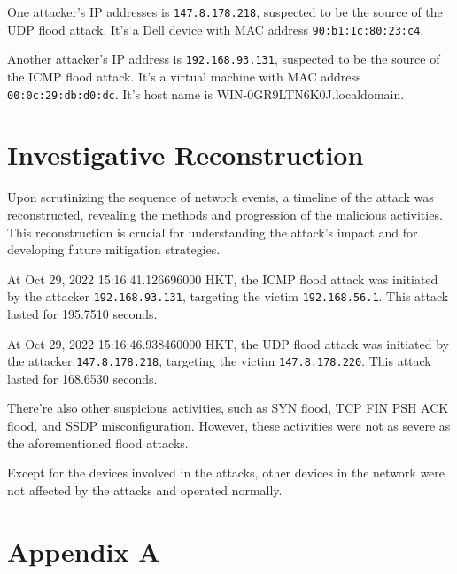 \documentclass{article}
\begin{document}
    One attacker's IP addresses is \lstinline|147.8.178.218|, suspected to be the source of the UDP flood attack.
    It's a Dell device with MAC address \lstinline|90:b1:1c:80:23:c4|.

    Another attacker's IP address is \lstinline|192.168.93.131|, suspected to be the source of the ICMP flood attack.
    It's a virtual machine with MAC address \lstinline|00:0c:29:db:d0:dc|.
    It's host name is WIN-0GR9LTN6K0J.localdomain.

    
    \section{\fontsize{14pt}{17pt}\selectfont Investigative Reconstruction}\label{sec:selectfont-investigative-reconstruction}
    Upon scrutinizing the sequence of network events, a timeline of the attack was reconstructed,
    revealing the methods and progression of the malicious activities.
    This reconstruction is crucial for understanding the attack's impact and for developing future mitigation strategies.

    At Oct 29, 2022 15:16:41.126696000 HKT, the ICMP flood attack was initiated by the attacker \lstinline|192.168.93.131|,
    targeting the victim \lstinline|192.168.56.1|. This attack lasted for 195.7510 seconds.

    At Oct 29, 2022 15:16:46.938460000 HKT, the UDP flood attack was initiated by the attacker \lstinline|147.8.178.218|,
    targeting the victim \lstinline|147.8.178.220|. This attack lasted for 168.6530 seconds.

    There're also other suspicious activities, such as SYN flood, TCP FIN PSH ACK flood, and SSDP misconfiguration.
    However, these activities were not as severe as the aforementioned flood attacks.

    Except for the devices involved in the attacks, other devices in the network were not affected by the attacks and operated normally.


    \section*{\fontsize{14pt}{17pt}\selectfont Appendix A}\label{sec:selectfont-appendix-a}
\end{document}
